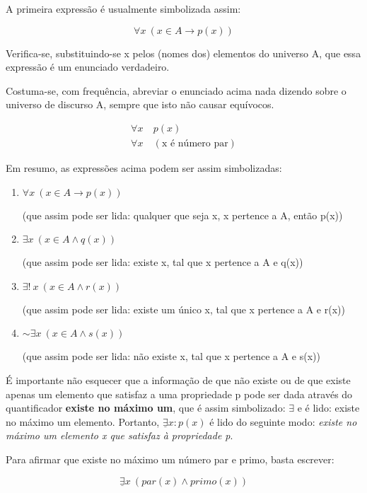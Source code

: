 A primeira expressão é usualmente simbolizada assim:

$$\forall x\ (x \in A \to p(x))$$

Verifica-se, substituindo-se x pelos (nomes dos) elementos do universo A, que essa expressão é um enunciado verdadeiro.

Costuma-se, com frequência, abreviar o enunciado acima nada dizendo sobre o universo de discurso A, sempre que isto não causar equívocos.

\begin{align*}
    \forall x\ & p(x) \\
    \forall x\ & (\text{x é número par})
\end{align*}

Em resumo, as expressões acima podem ser assim simbolizadas:

\begin{enumerate}[label=(\roman*)]
    \item $\forall x\ (x \in A \to p(x))$

    (que assim pode ser lida: qualquer que seja x, x pertence a A, então p(x))
    \item $\exists x\ (x \in A \land q(x))$

    (que assim pode ser lida: existe x, tal que x pertence a A e q(x))
    \item $\exists!\ x\ (x \in A \land r(x))$

    (que assim pode ser lida: existe um único x, tal que x pertence a A e r(x))
    \item $\sim \exists x\ (x \in A \land s(x))$

    (que assim pode ser lida: não existe x, tal que x pertence a A e s(x))
\end{enumerate}

É importante não esquecer que a informação de que não existe ou de que existe apenas um elemento que satisfaz a uma propriedade p pode ser dada através do quantificador \textbf{existe no máximo um}, que é assim simbolizado: \underline{$\exists$} e é lido: existe no máximo um elemento.
Portanto, $\underline{\exists} x \colon p(x)$ é lido do seguinte modo: \textit{existe no máximo um elemento x que satisfaz à propriedade p}.

\begin{exemplo}
    Para afirmar que existe no máximo um número par e primo, basta escrever:

    $$\underline{\exists}x\ (par(x) \land primo(x))$$
\end{exemplo}

